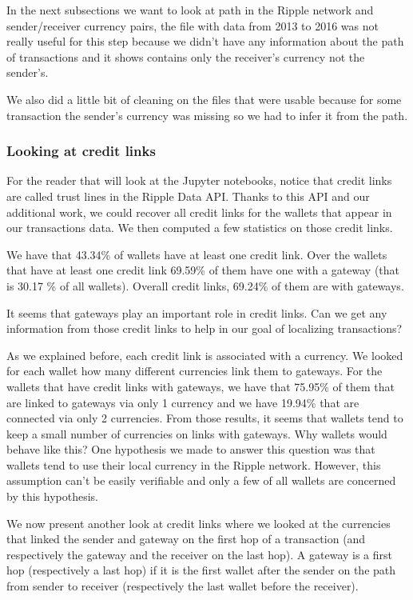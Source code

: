 In the next subsections we want to look at path in the Ripple network and sender/receiver currency pairs, the file with data from 2013 to 2016 was not really useful for this step because we didn't have any information about the path of transactions and it shows contains only the receiver's currency not the sender's.

We also did a little bit of cleaning on the files that were usable because for some transaction the sender's currency was missing so we had to infer it from the path.

\subsubsection{Looking at credit links}
For the reader that will look at the Jupyter notebooks, notice that credit links are called trust lines in the Ripple Data API\cite{data-api}. Thanks to this API and our additional work, we could recover all credit links for the wallets that appear in our transactions data. We then computed a few statistics on those credit links.

We have that 43.34\% of wallets have at least one credit link. Over the wallets that have at least one credit link 69.59\% of them have one with a gateway (that is 30.17 \% of all wallets). Overall credit links, 69.24\% of them are with gateways.

It seems that gateways play an important role in credit links. Can we get any information from those credit links to help in our goal of localizing transactions?

As we explained before, each credit link is associated with a currency. We looked for each wallet how many different currencies link them to gateways. For the wallets that have credit links with gateways, we have that 75.95\% of them that are linked to gateways via only 1 currency and we have 19.94\% that are connected via only 2 currencies. From those results, it seems that wallets tend to keep a small number of currencies on links with gateways. Why wallets would behave like this? One hypothesis we made to answer this question was that wallets tend to use their local currency in the Ripple network. However, this assumption can't be easily verifiable and only a few of all wallets are concerned by this hypothesis.

We now present another look at credit links where we looked at the currencies that linked the sender and gateway on the first hop of a transaction (and respectively the gateway and the receiver on the last hop). A gateway is a first hop (respectively a last hop) if it is the first wallet after the sender on the path from sender to receiver (respectively the last wallet before the receiver).

